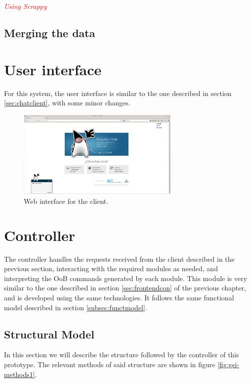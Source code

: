 \emph{\textcolor{red}{Using Scrappy}}

\subsection{Merging the data}

\section{User interface}

For this system, the user interface is similar to the one described in section \ref{sec:chatclient}, with some minor changes. 

\begin{figure}[!htbp]
    \centering
    \includegraphics[width=0.7\textwidth]{img/screens/ask-client.png}
    \caption{Web interface for the client.}
    \label{fig:gsichat1}
\end{figure}


\section{Controller}
\label{sec:controllergsi}

The controller handles the requests received from the client described in the previous section, interacting with the required modules as needed, and interpreting the \ac{OoB} commands generated by each module. This module is very similar to the one described in section \ref{sec:frontendcon} of the previous chapter, and is developed using the same technologies. It follows the same functional model described in section \ref{subsec:functmodel}.

\subsection{Structural Model}

In this section we will describe the structure followed by the controller of this prototype. The relevant methods of said structure are shown in figure \ref{fig:gsi-methods1}.

